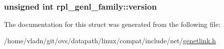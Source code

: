\subsubsection[{version}]{\setlength{\rightskip}{0pt plus 5cm}unsigned int rpl\+\_\+genl\+\_\+family\+::version}\label{structrpl__genl__family_a09a64c948abbbd61907dfd9f0d17663d}


The documentation for this struct was generated from the following file\+:\begin{DoxyCompactItemize}
\item 
/home/vladn/git/ovs/datapath/linux/compat/include/net/\hyperlink{genetlink_8h}{genetlink.\+h}\end{DoxyCompactItemize}
